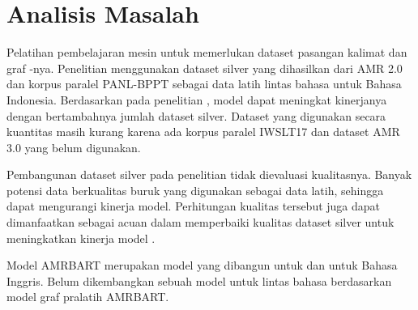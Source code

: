 \section{Analisis Masalah}

Pelatihan pembelajaran mesin untuk  \amrparsing{} memerlukan dataset  pasangan kalimat dan graf \AMR{}-nya.
Penelitian \textcite{putra2022} menggunakan dataset silver yang dihasilkan dari AMR 2.0 dan korpus paralel PANL-BPPT sebagai data latih \amrparsing{} lintas bahasa untuk Bahasa Indonesia.
Berdasarkan pada penelitian \textcite{lee2022}, model \amrparsing{} dapat meningkat kinerjanya dengan bertambahnya jumlah dataset silver.
Dataset yang digunakan \textcite{putra2022} secara kuantitas masih kurang karena ada korpus paralel IWSLT17 dan dataset AMR 3.0 yang belum digunakan.

Pembangunan dataset silver pada penelitian \textcite{putra2022} tidak dievaluasi kualitasnya.
Banyak potensi  data berkualitas buruk yang digunakan sebagai data latih, sehingga dapat mengurangi kinerja model.
Perhitungan kualitas tersebut juga dapat dimanfaatkan sebagai acuan dalam memperbaiki kualitas dataset silver untuk meningkatkan kinerja model \amrparsing{}.

Model \gls{AMRBART}  merupakan model \sota{} yang dibangun untuk \amrparsing{} dan \AMRtoTEXT{} untuk Bahasa Inggris.
Belum dikembangkan sebuah model \amrparsing{} untuk lintas bahasa berdasarkan model graf pralatih \gls{AMRBART}.
